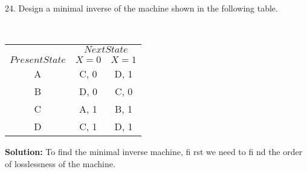 \documentclass[8pt]{beamer}
\begin{document}
\begin{frame}
24. Design a minimal inverse of the machine shown in the following table.\\
\begin{flushright}
  [WBUT 2007, 2008]\\
\end{flushright}
  
  \pause
  \begin{center}
\begin{tabular}{ccc}
 \hline

 \hline

 \hline

 \hline
 & \multicolumn{2}{c}{$Next State$}\\
 \cline{2-3}
 $Present State$ &  $X=0$ & $X=1$\\
\hline
A & C, 0  &D, 1\\
B & D, 0  &C, 0\\
C & A, 1  &B, 1\\
D & C, 1  &D, 1\\
 \hline

 \hline

 \hline

 \hline
\end{tabular}
\end{center}

\vspace*{0.3cm}
\hspace*{0.5cm} \textbf{Solution:} To find the minimal inverse machine, fi rst we need to fi nd the order of losslessness of
the machine.\\
\end{frame}
\end{document}
